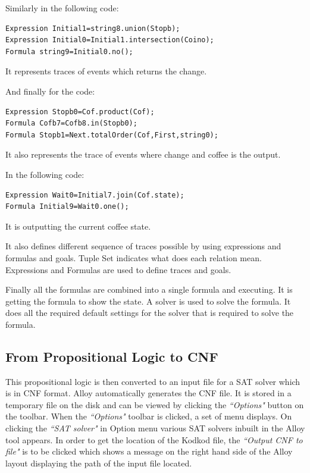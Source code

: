 \documentclass[a4paper,12pt]{report}
\begin{document}
\begin{onehalfspacing}
Similarly in the following code: 
\begin{verbatim}
Expression Initial1=string8.union(Stopb);
Expression Initial0=Initial1.intersection(Coino);
Formula string9=Initial0.no();
\end{verbatim}
It represents traces of events which returns the change.

And finally for the code:
\begin{verbatim}
Expression Stopb0=Cof.product(Cof);
Formula Cofb7=Cofb8.in(Stopb0);
Formula Stopb1=Next.totalOrder(Cof,First,string0);
\end{verbatim}
It also represents the trace of events where change and coffee is the output. 

In the following code:
\begin{verbatim}
Expression Wait0=Initial7.join(Cof.state);
Formula Initial9=Wait0.one();
\end{verbatim}
It is outputting the current coffee state.

It also defines different sequence of traces possible by using expressions and formulas and goals. Tuple Set indicates what does each relation mean. Expressions and Formulas are used to define traces and goals.

Finally all the formulas are combined into a single formula and executing. It is getting the formula to show the state. A solver is used to solve the formula. It does all the required default settings for the solver that is required to solve the formula.
 
\subsection{From Propositional Logic to CNF}
\label{Prop to CNF} 
This propositional logic is then converted to an input file for a SAT solver which is in CNF format. Alloy automatically generates the CNF file. It is stored in a temporary file on the disk and can be viewed by clicking the \textit{``Options"} button on the toolbar. When the \textit{``Options"} toolbar is clicked, a set of menu displays. On clicking the \textit{``SAT solver"} in Option menu various SAT solvers inbuilt in the Alloy tool appears. In order to get the location of the Kodkod file, the \textit{``Output CNF to file"} is to be clicked which shows a message on the right hand side of the Alloy layout displaying the path of the input file located.


\end{onehalfspacing}
\end{document}
